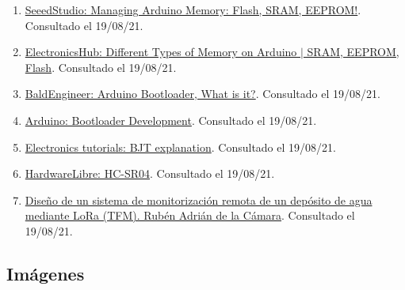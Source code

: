 \documentclass[12pt]{article}
\begin{document}
\begin{enumerate}
			\item 
			\label{bib: seeedstudio arduino memory}
			\href{https://www.seeedstudio.com/blog/2021/04/26/managing-arduino-memory-flash-sram-eeprom/}{SeeedStudio: Managing Arduino Memory: Flash, SRAM, EEPROM!}. Consultado el 19/08/21.	
				
			\item 
			\label{bib: electronicsHub arduino memory}
			\href{https://www.electronicshub.org/types-of-memory-on-arduino/#Volatile_vs_Non-Volatile}{ElectronicsHub: Different Types of Memory on Arduino $\vert$ SRAM, EEPROM, Flash}. Consultado el 19/08/21.

			\item 
			\label{bib: baldEngineer arduino bootloader}
			\href{https://www.baldengineer.com/arduino-bootloader.html}{BaldEngineer: Arduino Bootloader, What is it?}. Consultado el 19/08/21.	
			
			\item 
			\label{bib: Arduino cc  bootloader}
			\href{https://www.arduino.cc/en/hacking/bootloader}{Arduino: Bootloader Development}. Consultado el 19/08/21.
			
			\item
			\label{electronics tutos bjt}
			\href{https://www.electronics-tutorials.ws/transistor/tran_1.html}{Electronics tutorials: BJT explanation}. Consultado el 19/08/21.
			
			\item
			\label{hwlibre hc-sr04}
			\href{https://www.hwlibre.com/hc-sr04/}{HardwareLibre: HC-SR04}. Consultado el 19/08/21.	
			
			\item 
			\label{TFM LoRa}
			\href{http://openaccess.uoc.edu/webapps/o2/bitstream/10609/97127/8/radriandTFM0619memoria.pdf}{Diseño de un sistema de
monitorización remota de un
depósito de agua mediante
LoRa (TFM). Rubén Adrián de la Cámara}. Consultado el 19/08/21.
			
		\end{enumerate}
		
		\subsection*{Imágenes}
		
\end{document}
